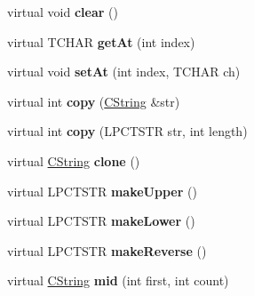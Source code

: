 \begin{DoxyCompactItemize}
\item 
\hypertarget{class_c_string_a86bdac885b2d28689a62cbb6ae8b9ee4}{virtual void {\bfseries clear} ()}\label{class_c_string_a86bdac885b2d28689a62cbb6ae8b9ee4}

\item 
\hypertarget{class_c_string_ae1bcd2dd9d59762b41fe898916bfdd23}{virtual T\-C\-H\-A\-R {\bfseries get\-At} (int index)}\label{class_c_string_ae1bcd2dd9d59762b41fe898916bfdd23}

\item 
\hypertarget{class_c_string_a99eaccef0daa453bf36ec886ae9b42c4}{virtual void {\bfseries set\-At} (int index, T\-C\-H\-A\-R ch)}\label{class_c_string_a99eaccef0daa453bf36ec886ae9b42c4}

\item 
\hypertarget{class_c_string_a181b18bf81568cee519617106706963f}{virtual int {\bfseries copy} (\hyperlink{class_c_string}{C\-String} \&str)}\label{class_c_string_a181b18bf81568cee519617106706963f}

\item 
\hypertarget{class_c_string_a98fd9f07225ffd32a683d0ffe3e70bac}{virtual int {\bfseries copy} (L\-P\-C\-T\-S\-T\-R str, int length)}\label{class_c_string_a98fd9f07225ffd32a683d0ffe3e70bac}

\item 
\hypertarget{class_c_string_aeebb301ee8968688fd6ea8029a95ce9c}{virtual \hyperlink{class_c_string}{C\-String} {\bfseries clone} ()}\label{class_c_string_aeebb301ee8968688fd6ea8029a95ce9c}

\item 
\hypertarget{class_c_string_a7a027f50c1bede9a37d12ec9d2cc6616}{virtual L\-P\-C\-T\-S\-T\-R {\bfseries make\-Upper} ()}\label{class_c_string_a7a027f50c1bede9a37d12ec9d2cc6616}

\item 
\hypertarget{class_c_string_af4236022a2befbcee7c1eaad21ba6798}{virtual L\-P\-C\-T\-S\-T\-R {\bfseries make\-Lower} ()}\label{class_c_string_af4236022a2befbcee7c1eaad21ba6798}

\item 
\hypertarget{class_c_string_a0b2512a4d0efb8c0317ef7a969268f07}{virtual L\-P\-C\-T\-S\-T\-R {\bfseries make\-Reverse} ()}\label{class_c_string_a0b2512a4d0efb8c0317ef7a969268f07}

\item 
\hypertarget{class_c_string_aae1e4a3db1f724363a300d706eae78b8}{virtual \hyperlink{class_c_string}{C\-String} {\bfseries mid} (int first, int count)}\label{class_c_string_aae1e4a3db1f724363a300d706eae78b8}


\end{DoxyCompactItemize}
